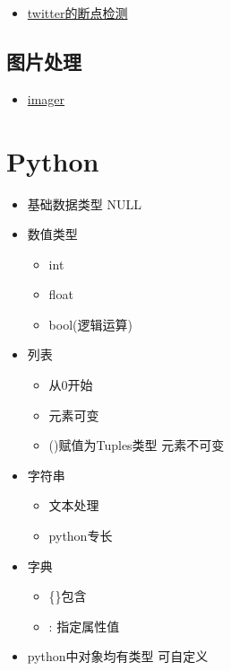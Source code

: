 \documentclass[
]{book}
\providecommand{\tightlist}{%
  \setlength{\itemsep}{0pt}\setlength{\parskip}{0pt}}
\begin{document}
\begin{itemize}
\tightlist
\item
  \href{https://github.com/twitter/BreakoutDetection}{twitter的断点检测}
\end{itemize}

\hypertarget{ux56feux7247ux5904ux7406}{%
\subsection{图片处理}\label{ux56feux7247ux5904ux7406}}

\begin{itemize}
\tightlist
\item
  \href{https://github.com/dahtah/imager}{imager}
\end{itemize}

\hypertarget{python}{%
\section{Python}\label{python}}

\begin{itemize}
\tightlist
\item
  基础数据类型 NULL
\item
  数值类型

  \begin{itemize}
  \tightlist
  \item
    int
  \item
    float
  \item
    bool(逻辑运算)
  \end{itemize}
\item
  列表

  \begin{itemize}
  \tightlist
  \item
    从0开始
  \item
    元素可变
  \item
    ()赋值为Tuples类型 元素不可变
  \end{itemize}
\item
  字符串

  \begin{itemize}
  \tightlist
  \item
    文本处理
  \item
    python专长
  \end{itemize}
\item
  字典

  \begin{itemize}
  \tightlist
  \item
    \{\}包含
  \item
    : 指定属性值
  \end{itemize}
\item
  python中对象均有类型 可自定义
\end{itemize}
\end{document}

